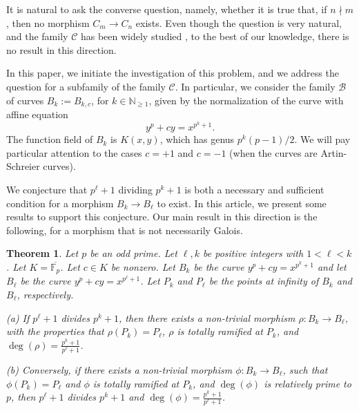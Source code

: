 \documentclass[oneside,a4paper,12pt]{article}
\newcommand{\F}{{\mathbb{F}}}
\theoremstyle{plain} %
\newtheorem{theorem}{Theorem}[section]
\theoremstyle{definition} %
\begin{document}
It is natural to ask the converse question, namely, whether it is true that, if $n\nmid m$, then no morphism $C_m\longrightarrow C_n$ exists.
Even though the question is very natural, and the family $\mathcal{C}$ has been widely studied \cite{WeierstrassPointsGarciaViana,Bouw2016,van1990reed,HKT}, to the best of our knowledge, there is no result in this direction.

In this paper, we initiate the investigation of this problem, and we address the question for a subfamily of the family $\mathcal{C}$. In particular, we consider the family $\mathcal{B}$ of curves $B_k:=B_{k,c}$, for $k\in \mathbb{N}_{\geq 1}$, given by the normalization of the curve with affine equation
\[
y^p+c y=x^{p^k+1}.
\]
The function field of $B_k$ is $K(x,y)$, which has genus $p^k(p-1)/2$.
We will pay particular attention to the cases $c=+1$ and $c=-1$ (when the curves
are Artin-Schreier curves).

We conjecture that $p^\ell +1$ dividing $p^k+1$ is both a necessary and sufficient condition 
for a morphism $ B_{k} \longrightarrow B_{\ell}$ to exist.
In this article, we present some results to support this conjecture. 
Our main result in this direction is the following, for a morphism
that is not necessarily Galois.



\begin{theorem}\label{intro1}
Let $p$ be an odd prime. Let $\ell, k$ be positive integers with $1<\ell <k$. 
Let $K=\overline{\F_p}$. Let $c \in K$ be nonzero.
Let $B_k$ be the curve $y^p+c y=x^{p^k+1}$ and let 
$B_\ell$ be the curve $y^p+c y=x^{p^\ell +1}$. 
Let $P_k$ and $P_\ell$ be the points at infinity of $B_k$ and $B_\ell$,
respectively.

(a) If $p^\ell +1$  divides $p^k+1$, then
     there exists a non-trivial morphism  
    $\rho : B_{k} \longrightarrow B_{\ell}$, with the properties that
    $\rho(P_k)=P_\ell$, $\rho$ is totally ramified at $P_k$,
    and $\deg (\rho)=\frac{p^k+1}{p^\ell +1}$.

(b) Conversely, if there exists a non-trivial morphism  
    $\phi : B_{k} \longrightarrow B_{\ell}$, such that $\phi (P_k)=P_\ell$ 
    and $\phi$ is totally ramified at $P_k$, 
    and $\deg (\phi)$ is relatively prime to $p$,
    then $p^\ell +1$  divides $p^k+1$ and
    $\deg (\phi)=\frac{p^k+1}{p^\ell +1}$.
\end{theorem}
\end{document}
